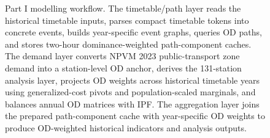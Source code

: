 \documentclass[preprint,12pt]{elsarticle}
\begin{document}
\begin{figure}[htbp]
{%
}
\caption[Part I modelling workflow]{Part I modelling workflow. The timetable/path layer reads the historical timetable inputs, parses compact timetable tokens into concrete events, builds year-specific event graphs, queries OD paths, and stores two-hour dominance-weighted path-component caches. The demand layer converts NPVM 2023 public-transport zone demand into a station-level OD anchor, derives the 131-station analysis layer, projects OD weights across historical timetable years using generalized-cost pivots and population-scaled marginals, and balances annual OD matrices with IPF. The aggregation layer joins the prepared path-component cache with year-specific OD weights to produce OD-weighted historical indicators and analysis outputs.}

\label{fig:part1-workflow}
\end{figure}
\end{document}
